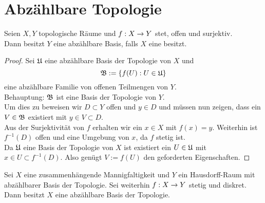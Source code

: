 
\section{Abzählbare Topologie}
\label{sec:Topologie}

\begin{lemma}
  \label{lemma:surj-offen-top}
  Seien $X,Y$ topologische Räume und $f: X \rightarrow Y$ stet, offen und
  surjektiv. \\
  Dann besitzt $Y$ eine abzählbare Basis, falls $X$ eine besitzt.
\end{lemma}

\begin{proof}
  Sei $\mathfrak{U}$ eine abzählbare Basis der Topologie von $X$ und
  \[
  \mathfrak{B} := \{ f(U) : U \in \mathfrak{U} \}
  \]
  eine abzählbare Familie von offenen Teilmengen von $Y$. \\
  Behauptung: $\mathfrak{B}$ ist eine Basis der Topologie von $Y$. \\
  Um dies zu beweisen wir $D \subset Y$ offen und $y \in D$ und
  müssen nun zeigen, dass ein $V \in \mathfrak{B}$ existiert mit $y \in V
  \subset D$. \\
  Aus der Surjektivität von $f$ erhalten wir ein $x \in X$ mit $f(x) =
  y$. Weiterhin ist $f^{-1}(D)$ offen und eine Umgebung von $x$, da
  $f$ stetig ist. \\
  Da $\mathfrak{U}$ eine Basis der Topologie von $X$ ist existiert ein $U \in
  \mathfrak{U}$ mit $x \in U \subset f^{-1}(D)$. Also genügt $V:=f(U)$ den
  geforderten Eigenschaften.
\end{proof}

\begin{lemma}
  \label{lemma:poincare-volterra}
  Sei $X$ eine zusammenhängende Mannigfaltigkeit und $Y$ ein
  Hausdorff-Raum mit abzählbarer Basis der Topologie. Sei weiterhin
  $f: X \rightarrow Y$ stetig und diskret. \\
  Dann besitzt $X$ eine abzählbare Basis der Topologie.
\end{lemma}

